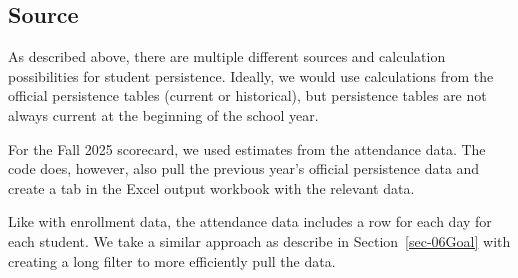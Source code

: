 \documentclass[
  letterpaper,
  DIV=11,
  numbers=noendperiod]{scrreprt}
\begin{document}
\subsection{Source}\label{source-10}

As described above, there are multiple different sources and calculation
possibilities for student persistence. Ideally, we would use
calculations from the official persistence tables (current or
historical), but persistence tables are not always current at the
beginning of the school year.

For the Fall 2025 scorecard, we used estimates from the attendance data.
The code does, however, also pull the previous year's official
persistence data and create a tab in the Excel output workbook with the
relevant data.

Like with enrollment data, the attendance data includes a row for each
day for each student. We take a similar approach as describe in
Section~\ref{sec-06Goal} with creating a long filter to more efficiently
pull the data.
\end{document}
